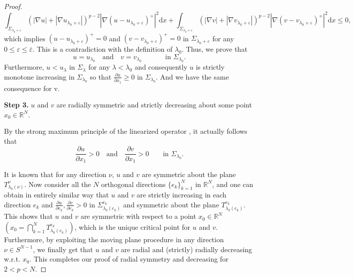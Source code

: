 \documentclass[12pt]{amsart}
\theoremstyle{definition}
\theoremstyle{remark}
\theoremstyle{conclusion}
\theoremstyle{conjecture}
\numberwithin{equation}{section}
\newcommand{\R}{\mathbb{R}}
\begin{document}
\begin{proof}
$$\int_{\Sigma_{\lambda_0+\varepsilon}} (|\nabla u|+|\nabla u_{\lambda_0+\varepsilon}|)^{p-2} |\nabla(u-u_{\lambda_0+\varepsilon})^+|^2 \mathrm{d}x + \int_{\Sigma_{\lambda_0+\varepsilon}} (|\nabla v|+|\nabla v_{\lambda_0+\varepsilon}|)^{p-2} |\nabla(v-v_{\lambda_0+\varepsilon})^+|^2 \mathrm{d}x\leq 0,$$
which implies $(u-u_{\lambda_0+\varepsilon})^+=0$ and $(v-v_{\lambda_0+\varepsilon})^+=0$ in $\Sigma_{\lambda_0+\varepsilon}$ for any $0\leq\varepsilon\leq\overline{\varepsilon}$. This is a contradiction with the definition of $\lambda_0$.
Thus, we prove that
$$ u=u_{\lambda_0} \quad \mbox{and} \quad v=v_{\lambda_0} \quad \quad\quad \,\,\mbox{in}\,\,\Sigma_{\lambda_0}.$$
Furthermore, $ u<u_{\lambda}$ in $\Sigma_\lambda$ for any $\lambda < \lambda_0$ and consequently $u$ is strictly monotone increasing in $\Sigma_{\lambda_0}$ so that $\frac{\partial u}{\partial x_{1}}\geq 0$ in $\Sigma_{\lambda_0}$. And we have the same consequence for v.

\medskip

{\bf Step 3.} $u$ and $v$ are radially symmetric and strictly decreasing about some point $x_0\in\R^N$.

By the strong maximum principle of the linearized operator \cite[Theorem 1.2]{LDBS}, it actually follows that
\begin{equation}\label{sd}
  \frac{\partial u}{\partial x_{1}}> 0 \quad \mbox{and} \quad \frac{\partial v}{\partial x_{1}}> 0\qquad \text{in} \,\, \Sigma_{\lambda_0}.
\end{equation}



It is known that for any direction $\nu$, $u$ and $v$ are symmetric about the plane $T^\nu_{\lambda_0(\nu)}$. Now consider all the $N$ orthogonal directions $\{e_k\}_{k=1}^N$ in $\R^N$, and one can obtain in entirely similar way that $u$ and $v$ are strictly increasing in each direction $e_k$ and $\frac{\partial u}{\partial e_{k}}, \frac{\partial v}{\partial e_{k}}>0$ in $\Sigma^{e_k}_{\lambda_0(e_k)}$ and symmetric about the plane $T^{e_k}_{\lambda_0(e_k)}$. This shows that $u$ and $v$ are symmetric with respect to a point $x_0\in\R^N$ $(x_0 = \bigcap^N_{k=1}T^{e_k}_{\lambda_0(e_k)})$, which is the unique critical point for $u$ and $v$. Furthermore, by exploiting the moving plane procedure in any direction $\nu\in S^{N-1}$, we finally get that $u$ and $v$ are radial and (strictly) radially decreasing w.r.t. $x_{0}$. This completes our proof of radial symmetry and decreasing for $2<p<N$.
\end{proof}
\end{document}
